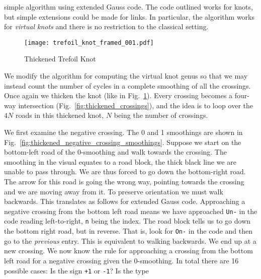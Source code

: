         simple algorithm using extended Gauss code. The code outlined works for
        knots, but simple extensions could be made for links. In particular, the
        algorithm works for \textit{virtual knots} and there is no restriction
        to the classical setting.
        \par\hfill\par
        \begin{figure}
            \centering
            \texttt{[image: trefoil\_knot\_framed\_001.pdf]}
            \caption{Thickened Trefoil Knot}
            \label{fig:trefoil_knot_framed_001}
        \end{figure}
        We modify the algorithm for computing the virtual knot genus so that we
        may instead count the number of cycles in a complete smoothing of all
        the crossings. Once again we thicken the knot
        (like in Fig.~\ref{fig:trefoil_knot_framed_001}). Every
        crossing becomes a four-way intersection
        (Fig.~\ref{fig:thickened_crossings}), and the idea is to loop
        over the $4N$ roads in this thickened knot, $N$ being the number of
        crossings.
        \par\hfill\par
        We first examine the negative crossing. The 0 and 1
        smoothings are shown in
        Fig.~\ref{fig:thickened_negative_crossing_smoothings}. Suppose we start
        on the bottom-left road of the 0-smoothing and walk towards the
        crossing. The smoothing in the visual equates to a road block, the thick
        black line we are unable to pass through. We are thus forced to go down
        the bottom-right road. The arrow for this road is going the wrong way,
        pointing towards the crossing and we are moving away from it.
        To preserve orientation we must walk backwards. This translates as
        follows for extended Gauss code. Approaching a negative crossing from
        the bottom left road means we have approached \texttt{Un-} in
        the code reading left-to-right, \texttt{n} being the index. The
        road block tells us to go down the bottom right road, but in reverse.
        That is, look for \texttt{On-} in the code and then go
        to the \textit{previous} entry.
        This is equivalent to walking backwards. We end up at a new crossing.
        We now know the rule for approaching a crossing from the bottom left
        road for a negative crossing given the 0-smoothing. In total there are
        16 possible cases: Is the sign \texttt{+1} or \texttt{-1}? Is the type
